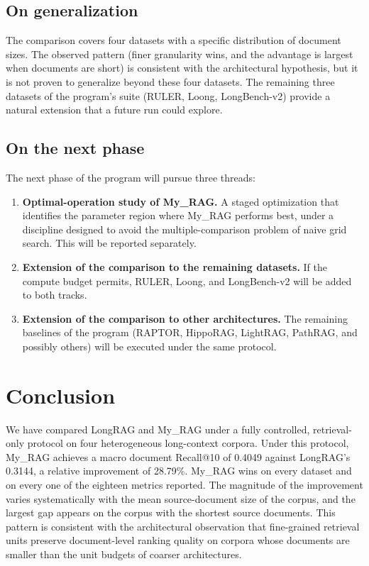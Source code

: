 \documentclass[11pt,a4paper]{article}
\begin{document}
\subsection{On generalization}
The comparison covers four datasets with a specific distribution of
document sizes. The observed pattern (finer granularity wins, and
the advantage is largest when documents are short) is consistent
with the architectural hypothesis, but it is not proven to
generalize beyond these four datasets. The remaining three datasets
of the program's suite (RULER, Loong, LongBench-v2) provide a
natural extension that a future run could explore.

\subsection{On the next phase}
The next phase of the program will pursue three threads:

\begin{enumerate}[leftmargin=1.5em,itemsep=0.15em]
  \item \textbf{Optimal-operation study of My\_RAG.} A staged
    optimization that identifies the parameter region where My\_RAG
    performs best, under a discipline designed to avoid the
    multiple-comparison problem of naive grid search. This will be
    reported separately.
  \item \textbf{Extension of the comparison to the remaining
    datasets.} If the compute budget permits, RULER, Loong, and
    LongBench-v2 will be added to both tracks.
  \item \textbf{Extension of the comparison to other
    architectures.} The remaining baselines of the program (RAPTOR,
    HippoRAG, LightRAG, PathRAG, and possibly others) will be
    executed under the same protocol.
\end{enumerate}

\section{Conclusion}

We have compared LongRAG and My\_RAG under a fully controlled,
retrieval-only protocol on four heterogeneous long-context corpora.
Under this protocol, My\_RAG achieves a macro document Recall@10 of
\num{0.4049} against LongRAG's \num{0.3144}, a relative improvement
of \num{28.79}\%. My\_RAG wins on every dataset and on every one of
the eighteen metrics reported. The magnitude of the improvement
varies systematically with the mean source-document size of the
corpus, and the largest gap appears on the corpus with the shortest
source documents. This pattern is consistent with the architectural
observation that fine-grained retrieval units preserve document-level
ranking quality on corpora whose documents are smaller than the
unit budgets of coarser architectures.
\end{document}
